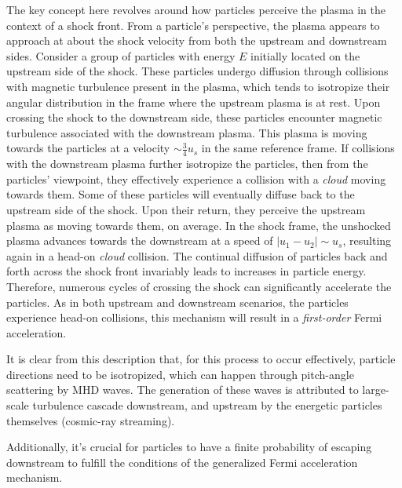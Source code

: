 The key concept here revolves around how particles perceive the plasma in the context of a shock front. From a particle's perspective, the plasma appears to approach at about the shock velocity from both the upstream and downstream sides.
%
Consider a group of particles with energy \( E \) initially located on the upstream side of the shock. These particles undergo diffusion through collisions with magnetic turbulence present in the plasma, which tends to isotropize their angular distribution in the frame where the upstream plasma is at rest.
%
Upon crossing the shock to the downstream side, these particles encounter magnetic turbulence associated with the downstream plasma. This plasma is moving towards the particles at a velocity \( \sim \frac{3}{4} u_s \) in the same reference frame. If collisions with the downstream plasma further isotropize the particles, then from the particles' viewpoint, they effectively experience a collision with a \emph{cloud} moving towards them. 
%
Some of these particles will eventually diffuse back to the upstream side of the shock. Upon their return, they perceive the upstream plasma as moving towards them, on average. In the shock frame, the unshocked plasma advances towards the downstream at a speed of \( |u_1 - u_2| \sim u_s \), resulting again in a head-on \emph{cloud} collision.
%
The continual diffusion of particles back and forth across the shock front invariably leads to increases in particle energy. Therefore, numerous cycles of crossing the shock can significantly accelerate the particles. 
%
As in both upstream and downstream scenarios, the particles experience head-on collisions, this mechanism will result in a  \emph{first-order} Fermi acceleration.



It is clear from this description that, for this process to occur effectively, particle directions need to be isotropized, which can happen through pitch-angle scattering by MHD waves. The generation of these waves is attributed to large-scale turbulence cascade downstream, and upstream by the energetic particles themselves (cosmic-ray streaming).

Additionally, it's crucial for particles to have a finite probability of escaping downstream to fulfill the conditions of the generalized Fermi acceleration mechanism.

